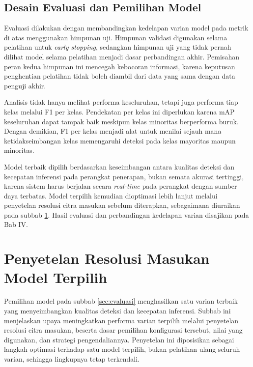 \subsection{Desain Evaluasi dan Pemilihan Model}

Evaluasi dilakukan dengan membandingkan kedelapan varian model pada metrik di atas 
menggunakan himpunan uji. Himpunan validasi digunakan selama pelatihan untuk 
\textit{early stopping}, sedangkan himpunan uji yang tidak pernah dilihat model selama 
pelatihan menjadi dasar perbandingan akhir. Pemisahan peran kedua himpunan ini mencegah 
kebocoran informasi, karena keputusan penghentian pelatihan tidak boleh diambil dari data 
yang sama dengan data penguji akhir.

Analisis tidak hanya melihat performa keseluruhan, tetapi juga performa tiap kelas melalui 
F1 per kelas. Pendekatan per kelas ini diperlukan karena mAP keseluruhan dapat tampak baik 
meskipun kelas minoritas berperforma buruk. Dengan demikian, F1 per kelas menjadi alat untuk 
menilai sejauh mana ketidakseimbangan kelas memengaruhi deteksi pada kelas mayoritas maupun 
minoritas.

Model terbaik dipilih berdasarkan keseimbangan antara kualitas deteksi dan kecepatan 
inferensi pada perangkat penerapan, bukan semata akurasi tertinggi, karena sistem harus 
berjalan secara \textit{real-time} pada perangkat dengan sumber daya terbatas. Model terpilih 
kemudian dioptimasi lebih lanjut melalui penyetelan resolusi citra masukan sebelum 
diterapkan, sebagaimana diuraikan pada subbab \ref{sec:penyetelan}. Hasil evaluasi dan 
perbandingan kedelapan varian disajikan pada Bab IV.

\section{Penyetelan Resolusi Masukan Model Terpilih}
\label{sec:penyetelan}

Pemilihan model pada subbab \ref{sec:evaluasi} menghasilkan satu varian terbaik yang 
menyeimbangkan kualitas deteksi dan kecepatan inferensi. Subbab ini menjelaskan upaya 
meningkatkan performa varian terpilih melalui penyetelan resolusi citra masukan, beserta 
dasar pemilihan konfigurasi tersebut, nilai yang digunakan, dan strategi pengendaliannya. 
Penyetelan ini diposisikan sebagai langkah optimasi terhadap satu model terpilih, bukan 
pelatihan ulang seluruh varian, sehingga lingkupnya tetap terkendali.

